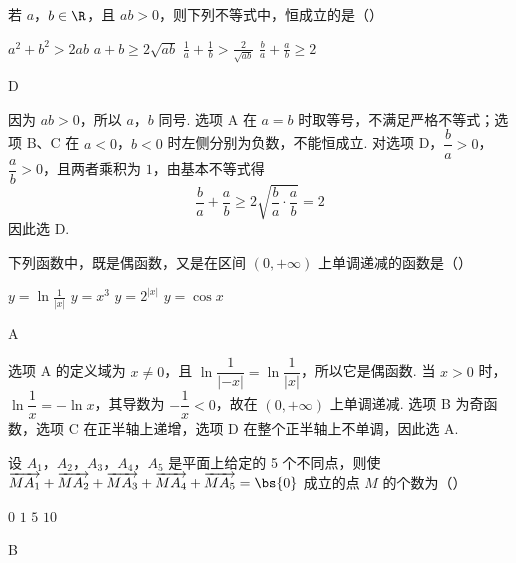 \begin{problem}
若 \(a\)，\(b \in \R\)，且 \(ab > 0\)，则下列不等式中，恒成立的是（\quad）

\choices
    {\(a^{2} + b^{2} > 2ab\)}
    {\(a + b \geqslant 2\sqrt{ab}\)}
    {\(\frac{1}{a} + \frac{1}{b} > \frac{2}{\sqrt{ab}}\)}
    {\(\frac{b}{a} + \frac{a}{b} \geqslant 2\)}
\end{problem}

\begin{answer}
D
\end{answer}

\begin{solution}
因为 \(ab>0\)，所以 \(a\)，\(b\) 同号. 选项 A 在 \(a=b\) 时取等号，不满足严格不等式；选项 B、C 在 \(a<0\)，\(b<0\) 时左侧分别为负数，不能恒成立. 对选项 D，\(\dfrac ba>0\)，\(\dfrac ab>0\)，且两者乘积为 \(1\)，由基本不等式得
\[
\frac ba+\frac ab\geqslant2\sqrt{\frac ba\cdot\frac ab}=2
\]
因此选 D.
\end{solution}

\begin{problem}
下列函数中，既是偶函数，又是在区间 \((0,+\infty)\) 上单调递减的函数是（\quad）

\choices
    {\(y = \ln \frac{1}{|x|}\)}
    {\(y = x^{3}\)}
    {\(y = 2^{|x|}\)}
    {\(y = \cos x\)}
\end{problem}

\begin{answer}
A
\end{answer}

\begin{solution}
选项 A 的定义域为 \(x\ne0\)，且 \(\ln\dfrac1{|{-x}|}=\ln\dfrac1{|x|}\)，所以它是偶函数. 当 \(x>0\) 时，\(\ln\dfrac1x=-\ln x\)，其导数为 \(-\dfrac1x<0\)，故在 \((0,+\infty)\) 上单调递减. 选项 B 为奇函数，选项 C 在正半轴上递增，选项 D 在整个正半轴上不单调，因此选 A.
\end{solution}

\begin{problem}
设 \(A_1\)，\(A_2\)，\(A_3\)，\(A_4\)，\(A_5\) 是平面上给定的 5 个不同点，则使 \(\overrightarrow{MA_1} + \overrightarrow{MA_2} + \overrightarrow{MA_3} + \overrightarrow{MA_4} + \overrightarrow{MA_5} = \bs{0}\) 成立的点 \(M\) 的个数为（\quad）

\choices
    {\(0\)}
    {\(1\)}
    {\(5\)}
    {\(10\)}
\end{problem}

\begin{answer}
B
\end{answer}


